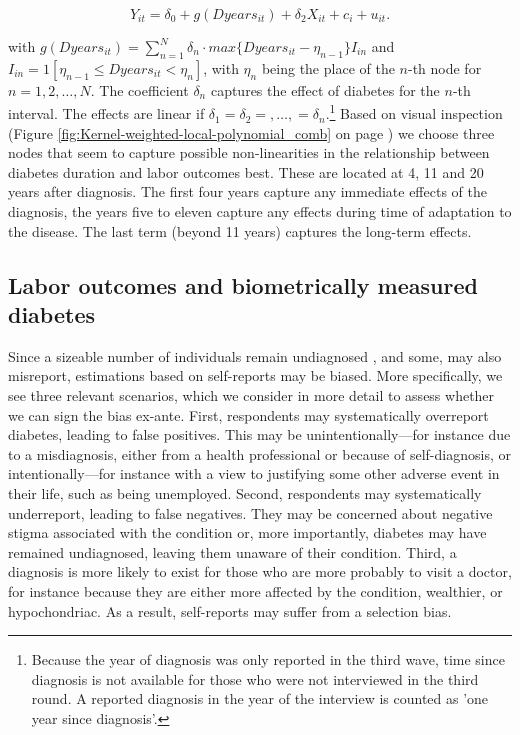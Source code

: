 \documentclass[12pt,english]{article}
\begin{document}
\begin{equation}
Y_{it}=\delta_{0}+g(Dyears_{it})+\delta_{2}X_{it}+c_{i}+u_{it}.\label{eq:splines}
\end{equation}

\noindent with $g(Dyears_{it})=\sum_{n=1}^{N}\delta_{n}\cdot max\{Dyears_{it}-\eta_{n-1}\}I_{in}$ and $I_{in}=1[\eta_{n-1}\leq Dyears_{it}<\eta_{n}]$, with $\eta_{n}$ being the place of the $n$-th node for $n=1,2,\ldots,N$. The coefficient $\delta_{n}$ captures the effect of diabetes for the $n$-th interval. The effects are linear if $\delta_{1}=\delta_{2}=,\ldots,=\delta_{n}$.\footnote{Because the year of diagnosis was only reported in the third wave, time since diagnosis is not available for those who were not interviewed in the third round.  A reported diagnosis in the year of the interview is counted as 'one year since diagnosis'.} Based on visual inspection (Figure \ref{fig:Kernel-weighted-local-polynomial_comb} on page \pageref{fig:Kernel-weighted-local-polynomial_comb}) we choose three nodes that seem to capture possible non-linearities in the relationship between diabetes duration and labor outcomes best. These are located at 4, 11 and 20 years after diagnosis. The first four years capture any immediate effects of the diagnosis, the years five to eleven capture any effects during time of adaptation to the disease. The last term (beyond 11 years) captures the long-term effects.

\subsection{\label{sec:Biomarker Strategy}Labor outcomes and biometrically measured diabetes}

Since a sizeable number of individuals remain undiagnosed , and some, may also misreport, estimations based on self-reports may be biased. More specifically, we see three relevant scenarios, which we consider in more detail to assess whether we can sign the bias ex-ante. First, respondents may systematically overreport diabetes, leading to false positives. This may be unintentionally---for instance due to a misdiagnosis, either from a health professional or because of self-diagnosis, or intentionally---for instance with a view to justifying some other adverse event in their life, such as being unemployed. Second, respondents may systematically underreport, leading to false negatives. They may be concerned about negative stigma associated with the condition or, more importantly, diabetes may have remained undiagnosed, leaving them unaware of their condition. Third, a diagnosis is more likely to exist for those who are more probably to visit a doctor, for instance because they are either more affected by the condition, wealthier, or hypochondriac. As a result, self-reports may suffer from a selection bias.
\end{document}
